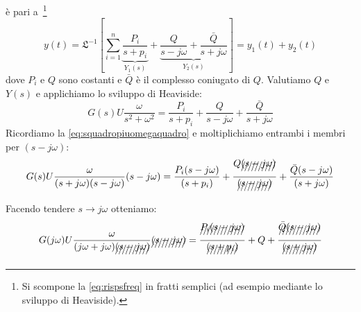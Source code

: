 \documentclass[a4paper]{report}
\begin{document}
\`e pari a~\footnote{Si scompone la \ref{eq:rispsfreq} in fratti
  semplici (ad esempio mediante lo sviluppo di Heaviside).}
\begin{equation}\label{eq:risptfreq}
  y(t)=\mathfrak{L}^{-1}\left [ \sum_{i=1}^n
    \underbrace{\frac{P_i}{s+p_i}}_{Y_1(s)} +
    \underbrace{\frac{Q}{s-j\omega} + \frac{\bar
        Q}{s+j\omega}}_{Y_2(s)} \right ] = y_1(t) + y_2(t)
\end{equation}
dove $P_i$ e $Q$ sono costanti e $\bar{Q}$ \`e il complesso coniugato
di $Q$. Valutiamo $Q$ e $Y(s)$ e applichiamo lo sviluppo di
Heaviside:
\[
  G(s) U \dfrac{\omega}{s^2 + \omega^2} = \dfrac{P_i}{s + p_i} +
  \dfrac{Q}{s - j\omega} + \dfrac{\bar{Q}}{s + j \omega}
\]
Ricordiamo la \ref{eq:squadropiuomegaquadro} e moltiplichiamo entrambi
i membri per $(s - j\omega)$: 
\[
  G(s) U \dfrac{\omega}{(s + j \omega)(s - j \omega)} (s - j \omega)=
  \dfrac{P_i (s - j \omega)}{(s + p_i)} + 
  \dfrac{Q\xout{(s - j \omega)}}{\xout{(s - j\omega)}} +
  \dfrac{\bar{Q}(s - j \omega)}{(s + j \omega)} 
\]
Facendo tendere $s \rightarrow j \omega$ otteniamo:
\[
  G(j\omega) U \dfrac{\omega}{(j\omega + j \omega)\xout{(s - j \omega)}} \xout{(s
    - j \omega)} =
  \dfrac{\xout{P_i (s - j \omega)}}{\xout{(s + p_i)}} + 
  Q + \dfrac{\xout{\bar{Q}(s - j \omega)}}{\xout{(s + j \omega)}}
\]
\end{document}
